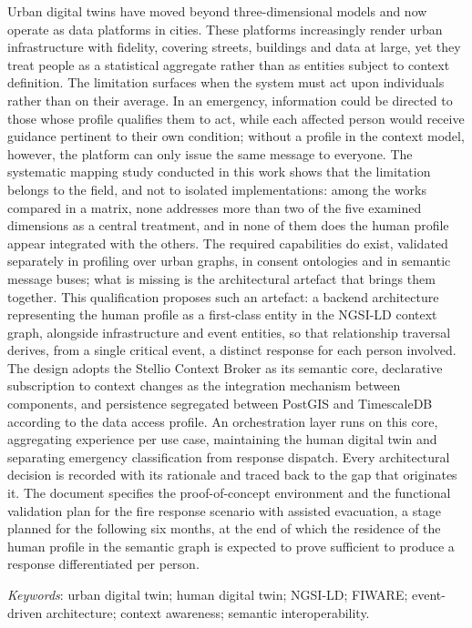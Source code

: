 \noindent Urban digital twins have moved beyond three-dimensional models and
now operate as data platforms in cities. These platforms increasingly render urban infrastructure with fidelity, covering streets, buildings and data at large, yet they treat people as a statistical aggregate rather than as entities subject to context definition. The limitation surfaces when the system must act upon individuals rather than on their average. In an emergency, information could be directed to those whose profile qualifies them to act, while each affected person would receive guidance pertinent to their own condition; without a profile in the context model, however, the platform can only issue the same message to everyone. The systematic mapping study conducted in this work shows that the limitation belongs to the field, and not to isolated implementations: among the works compared in a matrix, none addresses more than two of the five examined dimensions as a central treatment, and in none of them does the human profile appear integrated with the others. The required capabilities do exist, validated separately in profiling over urban graphs, in consent ontologies and in semantic message buses; what is missing is the architectural artefact that brings them together. This qualification proposes such an artefact: a backend architecture representing the human profile as a first-class entity in the NGSI-LD context graph, alongside infrastructure and event entities, so that relationship traversal derives, from a single critical event, a distinct response for each person involved. The design adopts the Stellio Context Broker as its semantic core, declarative subscription to context changes as the integration mechanism between components, and persistence segregated between PostGIS and TimescaleDB according to the data access profile. An orchestration layer runs on this core, aggregating experience per use case, maintaining the human digital twin and separating emergency classification from response dispatch. Every architectural decision is recorded with its rationale and traced back to the gap that originates it. The document specifies the proof-of-concept environment and the functional validation plan for the fire response scenario with assisted evacuation, a stage planned for the following six months, at the end of which the residence of the human profile in the semantic graph is expected to prove sufficient to produce a response differentiated per person.

\noindent\textit{Keywords}: urban digital twin; human digital twin; NGSI-LD;
FIWARE; event-driven architecture; context awareness; semantic interoperability.
